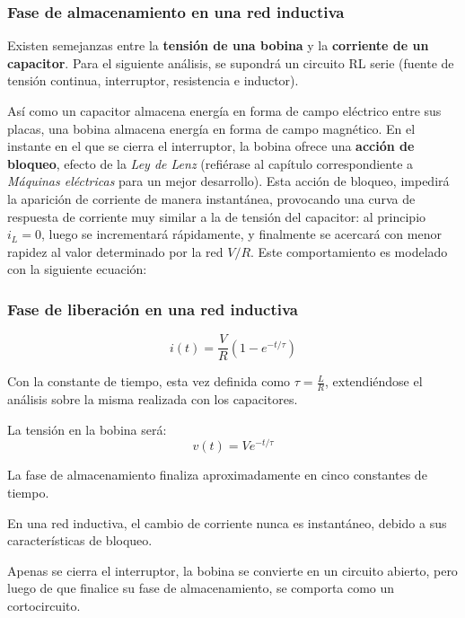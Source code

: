 \subsubsection{Fase de almacenamiento en una red inductiva}

Existen semejanzas entre la \textbf{tensión de una bobina} y la \textbf{corriente de un capacitor}. Para el siguiente análisis, se supondrá un circuito RL serie (fuente de tensión continua, interruptor, resistencia e inductor).

Así como un capacitor almacena energía en forma de campo eléctrico entre sus placas, una bobina almacena energía en forma de campo magnético. En el instante en el que se cierra el interruptor, la bobina ofrece una \textbf{acción de bloqueo}, efecto de la \textit{Ley de Lenz} (refiérase al capítulo correspondiente a \textit{Máquinas eléctricas} para un mejor desarrollo). Esta acción de bloqueo, impedirá la aparición de corriente de manera instantánea, provocando una curva de respuesta de corriente muy similar a la de tensión del capacitor: al principio $i_L = 0$, luego se incrementará rápidamente, y finalmente se acercará con menor rapidez al valor determinado por la red $V/R$. Este comportamiento es modelado con la siguiente ecuación:

\subsubsection{Fase de liberación en una red inductiva}
\begin{equation}
	\label{eq:almacenamiento_inductor_i}
	i(t)=\frac{V}{R}(1-e^{-t / \tau})
\end{equation}

Con la constante de tiempo, esta vez definida como $\tau = \frac{L}{R} $, extendiéndose el análisis sobre la misma realizada con los capacitores.

La tensión en la bobina será:
\begin{equation}
	\label{eq:almacenamiento_inductor_v}
	v(t)=Ve^{-t / \tau}
\end{equation}

\begin{conclusiones}
	La fase de almacenamiento finaliza aproximadamente en cinco constantes de tiempo.
	
	En una red inductiva, el cambio de corriente nunca es instantáneo, debido a sus características de bloqueo.
	
	Apenas se cierra el interruptor, la bobina se convierte en un circuito abierto, pero luego de que finalice su fase de almacenamiento, se comporta como un cortocircuito.
\end{conclusiones}
